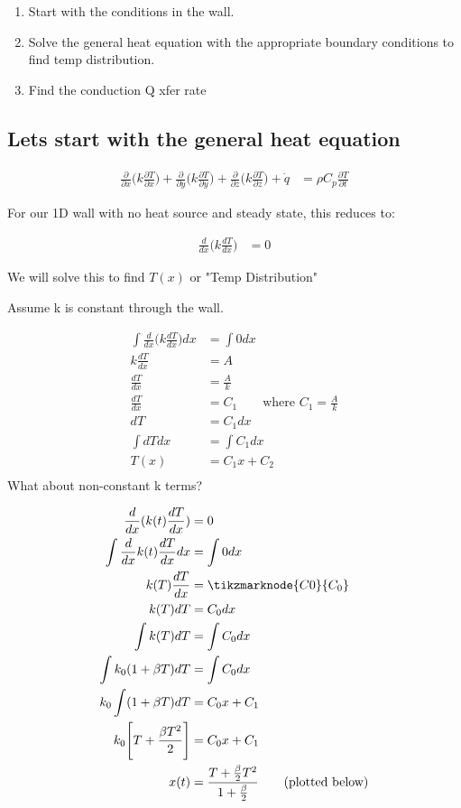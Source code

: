 \documentclass[11pt]{article}
\begin{document}
\begin{enumerate}
    \item Start with the conditions in the wall.
    \item Solve the general heat equation with the appropriate boundary conditions to find temp distribution.
    \item Find the conduction Q xfer rate 
\end{enumerate}

\subsection*{Lets start with the general heat equation}

\begin{align*}
    \frac{\partial}{\partial x}\Bigg(k\frac{\partial T}{\partial x}\Bigg) + \frac{\partial}{\partial y}\Bigg(k\frac{\partial T}{\partial y}\Bigg) + \frac{\partial}{\partial z}\Bigg(k\frac{\partial T}{\partial z}\Bigg) + \dot{q} &= \rho C_p \frac{\partial T}{\partial t}
\end{align*}




For our 1D wall with no heat source and steady state, this reduces to:


\begin{align*}
    \frac{d}{dx}\Bigg(k\frac{dT}{dx}\Bigg)&=0
\end{align*}

We will solve this to find $T(x)$ or "Temp Distribution"

Assume k is constant through the wall.

\begin{align*}
    \int\frac{d}{dx}\Bigg(k\frac{dT}{dx}\Bigg)dx&=\int 0 dx\\
    k\frac{dT}{dx}&= A\\
    \frac{dT}{dx}&=\frac{A}{k}\\
    \frac{dT}{dx}&=C_1 \quad\quad \text{where $C_1 = \frac{A}{k}$}\\
    dT&=C_1dx\\
    \int dT dx&=\int C_1 dx\\
    T(x)&=C_1x+C_2\\
\end{align*}
What about non-constant k terms?

\begin{align*}
\frac{d}{dx}(k(t)\frac{dT}{dx})&=0\\
\int \frac{d}{dx}k(t)\frac{dT}{dx}dx&=\int 0 dx\\
k(T)\frac{dT}{dx}&=\tikzmarknode{C0}{C_0}\\
k(T) dT &= C_0 dx\\
\int k(T) dT&= \int C_0 dx\\
\int k_0(1+\beta T) dT&= \int C_0 dx\\
k_0\int (1+\beta T) dT&= C_0x+C_1\\
k_0\Bigg[T+\frac{\beta T^2}{2}\Bigg]&= C_0x+C_1 \\
x(t)&=\frac{T+\frac{\beta}{2}T^2}{1+\frac{\beta}{2}} \tag{plotted below}
\end{align*}
\end{document}
